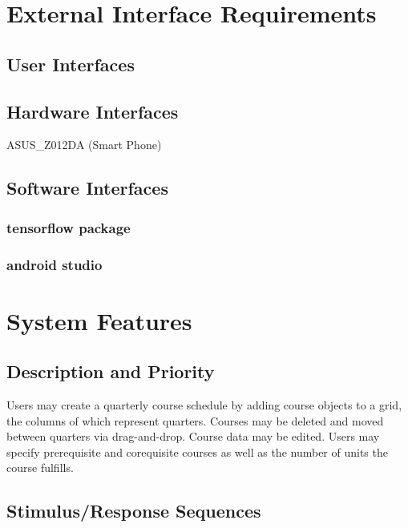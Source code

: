 \documentclass{scrreprt}
\begin{document}
\chapter{External Interface Requirements}

\section{User Interfaces}

\section{Hardware Interfaces}
ASUS_Z012DA (Smart Phone)

\section{Software Interfaces}
\subsection {tensorflow package}  


\subsection {android studio}



\chapter{System Features}

\section{Description and Priority}
Users may create a quarterly course schedule by adding course objects to a grid, the columns of which represent quarters. Courses may be deleted and moved between quarters via drag-and-drop. Course data may be edited. Users may specify prerequisite and corequisite courses as well as the number of units the course fulfills.

\section{Stimulus/Response Sequences}
\end{document}

